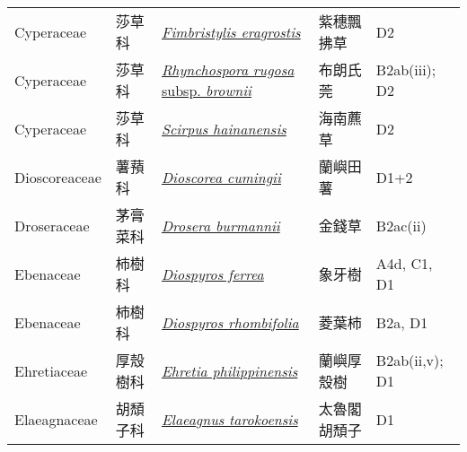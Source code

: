 {\begin{longtable}{L{2.5cm}L{2cm}L{5cm}L{2.5cm}L{3cm}}
    Cyperaceae & 莎草科 & \href{http://www.theplantlist.org/tpl1.1/search?q=Fimbristylis+eragrostis}{\textit{Fimbristylis eragrostis} } & 紫穗飄拂草 & D2    \\
    Cyperaceae & 莎草科 & \href{http://www.theplantlist.org/tpl1.1/search?q=Rhynchospora+rugosa+subsp.+brownii}{\textit{Rhynchospora rugosa} subsp. \textit{brownii} } & 布朗氏莞 & B2ab(iii); D2    \\
    Cyperaceae & 莎草科 & \href{http://www.theplantlist.org/tpl1.1/search?q=Scirpus+hainanensis}{\textit{Scirpus hainanensis} } & 海南藨草 & D2    \\
    Dioscoreaceae & 薯蕷科 & \href{http://www.theplantlist.org/tpl1.1/search?q=Dioscorea+cumingii}{\textit{Dioscorea cumingii} } & 蘭嶼田薯 & D1+2    \\
    Droseraceae & 茅膏菜科 & \href{http://www.theplantlist.org/tpl1.1/search?q=Drosera+burmannii}{\textit{Drosera burmannii} } & 金錢草 & B2ac(ii)    \\
    Ebenaceae & 柿樹科 & \href{http://www.theplantlist.org/tpl1.1/search?q=Diospyros+ferrea}{\textit{Diospyros ferrea} } & 象牙樹 & A4d, C1, D1    \\
    Ebenaceae & 柿樹科 & \href{http://www.theplantlist.org/tpl1.1/search?q=Diospyros+rhombifolia}{\textit{Diospyros rhombifolia} } & 菱葉柿 & B2a, D1    \\
    Ehretiaceae & 厚殼樹科 & \href{http://www.theplantlist.org/tpl1.1/search?q=Ehretia+philippinensis}{\textit{Ehretia philippinensis} } & 蘭嶼厚殼樹 & B2ab(ii,v); D1    \\
    Elaeagnaceae & 胡頹子科 & \href{http://www.theplantlist.org/tpl1.1/search?q=Elaeagnus+tarokoensis}{\textit{Elaeagnus tarokoensis} } & 太魯閣胡頹子 & D1    \\

\end{longtable}}
